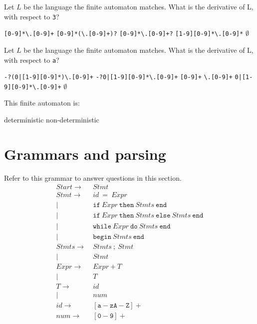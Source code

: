 \documentclass[addpoints,answers]{exam}
\begin{document}
\begin{questions}
\answerline[C]

\question Let $L$ be the language the finite automaton matches. What is the derivative of L, with respect to \verb$3$?

\begin{choices}
\choice \verb$[0-9]*\.[0-9]+$
\choice \verb$[0-9]*(\.[0-9]+)?$
\choice \verb$[0-9]*\.[0-9]+?$
\choice \verb$[1-9][0-9]*\.[0-9]*$
\choice $\emptyset$
\end{choices}

\answerline[B]

\question Let $L$ be the language the finite automaton matches. What is the derivative of L, with respect to \verb$a$?

\begin{choices}
\choice \verb$-?(0|[1-9][0-9]*)\.[0-9]+$
\choice \verb$-?0|[1-9][0-9]*\.[0-9]+$
\choice \verb$[0-9]+$
\choice \verb$\.[0-9]+$
\choice \verb$0|[1-9][0-9]*\.[0-9]+$
\choice $\emptyset$
\end{choices}

\answerline[F]

\question This finite automaton is:
\begin{oneparchoices}
\choice deterministic
\choice non-deterministic
\end{oneparchoices}
\answerline[B]
\pagebreak

\section{Grammars and parsing}
Refer to this grammar to answer questions in this section.
\begin{align*}
Start \to&~Stmt\\
Stmt \to&~id~\mathtt{=}~Expr\\
 |&~\mathtt{if}~Expr~\mathtt{then}~Stmts~\mathtt{end}\\
 |&~\mathtt{if}~Expr~\mathtt{then}~Stmts~\mathtt{else}~Stmts~\mathtt{end}\\
 |&~\mathtt{while}~Expr~\mathtt{do}~Stmts~\mathtt{end}\\
 |&~\mathtt{begin}~Stmts~\mathtt{end}\\
Stmts \to&~Stmts~\mathtt{;}~Stmt\\
|&~Stmt\\
Expr \to&~Expr~\mathtt{+}~T\\
|&~T\\
T \to&~id\\
|&~num\\
id \to&~\mathtt{[a-zA-Z]+}\\
num \to&~\mathtt{[0-9]+}
\end{align*}


\end{questions}
\end{document}

